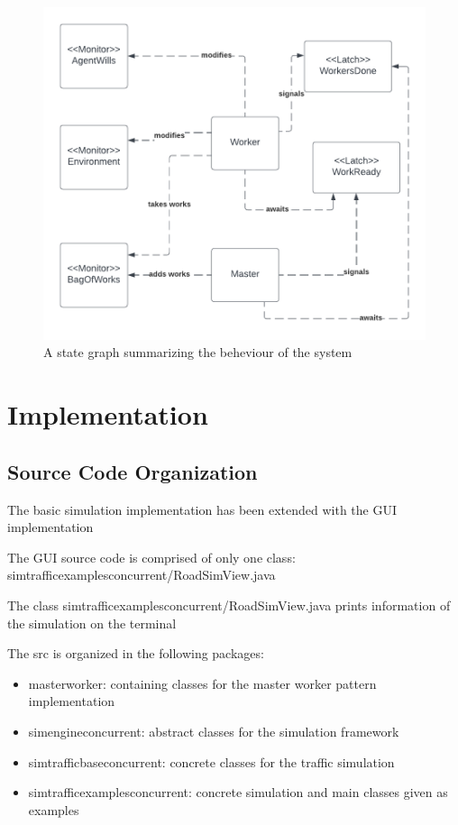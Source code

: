 \documentclass[12pt, a4paper]{report}
\begin{document}
\begin{figure}
    \caption{A state graph summarizing the beheviour of the system}
    \centering
    \includegraphics{UML1.png}
\end{figure}
\chapter{Implementation}

\section{Source Code Organization}
The basic simulation implementation has been extended with the GUI implementation

The GUI source code is comprised of only one class: simtrafficexamplesconcurrent/RoadSimView.java

The class simtrafficexamplesconcurrent/RoadSimView.java prints information of the simulation on the terminal

The src is organized in the following packages:
\begin{itemize}
    \item masterworker: containing classes for the master worker pattern implementation
    \item simengineconcurrent: abstract classes for the simulation framework
    \item simtrafficbaseconcurrent: concrete classes for the traffic simulation
    \item simtrafficexamplesconcurrent: concrete simulation and main classes given as examples
\end{itemize}
\end{document}
